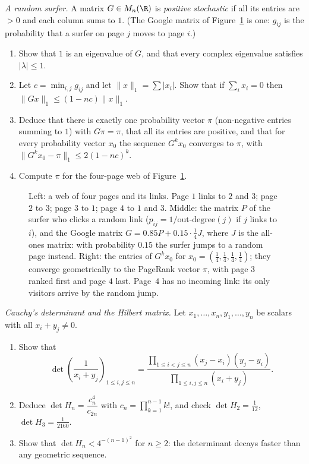 \begin{exercise}[$\star\star\star$]\label{ex:stochastic}
\emph{A random surfer.} A matrix $G\in M_n(\R)$ is \emph{positive stochastic} if all its entries are $>0$ and each column sums to $1$. (The Google matrix of Figure~\ref{fig:pagerank} is one: $g_{ij}$ is the probability that a surfer on page $j$ moves to page $i$.)
\begin{enumerate}[label=(\alph*)]
\item Show that $1$ is an eigenvalue of $G$, and that every complex eigenvalue satisfies $|\lambda|\le1$.
\item Let $c=\min_{i,j}g_{ij}$ and let $\|x\|_1=\sum|x_i|$. Show that if $\sum_ix_i=0$ then $\|Gx\|_1\le(1-nc)\|x\|_1$.
\item Deduce that there is exactly one probability vector $\pi$ (non-negative entries summing to $1$) with $G\pi=\pi$, that all its entries are positive, and that for every probability vector $x_0$ the sequence $G^kx_0$ converges to $\pi$, with $\|G^kx_0-\pi\|_1\le2(1-nc)^k$.
\item Compute $\pi$ for the four-page web of Figure~\ref{fig:pagerank}.
\end{enumerate}
\end{exercise}

\begin{figure}[ht]
\centering
{}
\caption{Left: a web of four pages and its links. Page $1$ links to $2$ and $3$; page $2$ to $3$; page $3$ to $1$; page $4$ to $1$ and $3$. Middle: the matrix $P$ of the surfer who clicks a random link ($p_{ij}=1/\text{out-degree}(j)$ if $j$ links to $i$), and the Google matrix $G=0.85P+0.15\cdot\frac14J$, where $J$ is the all-ones matrix: with probability $0.15$ the surfer jumps to a random page instead. Right: the entries of $G^kx_0$ for $x_0=(\frac14,\frac14,\frac14,\frac14)$; they converge geometrically to the PageRank vector $\pi$, with page $3$ ranked first and page $4$ last. Page~$4$ has no incoming link: its only visitors arrive by the random jump.}
\label{fig:pagerank}
\end{figure}

\begin{exercise}[$\star\star\star$]\label{ex:cauchydet}
\emph{Cauchy's determinant and the Hilbert matrix.} Let $x_1,\dots,x_n,y_1,\dots,y_n$ be scalars with all $x_i+y_j\ne0$.
\begin{enumerate}[label=(\alph*)]
\item Show that
\[
\det\left(\frac1{x_i+y_j}\right)_{1\le i,j\le n}=\frac{\prod_{1\le i<j\le n}(x_j-x_i)(y_j-y_i)}{\prod_{1\le i,j\le n}(x_i+y_j)} .
\]
\item Deduce $\det H_n=\dfrac{c_n^4}{c_{2n}}$ with $c_n=\prod_{k=1}^{n-1}k!$, and check $\det H_2=\frac1{12}$, $\det H_3=\frac1{2160}$.
\item Show that $\det H_n<4^{-(n-1)^2}$ for $n\ge2$: the determinant decays faster than any geometric sequence.
\end{enumerate}
\end{exercise}

